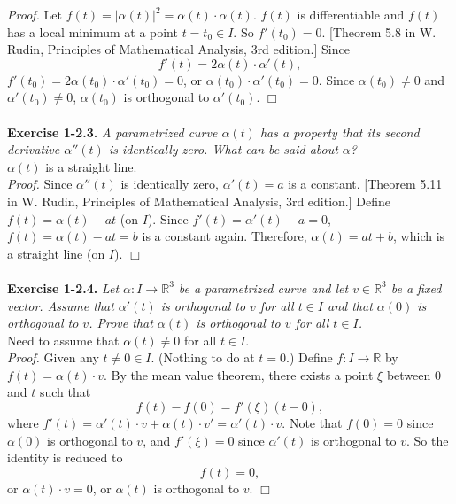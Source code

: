 \documentclass{article}
\begin{document}
\emph{Proof.}
Let $f(t) = |\alpha(t)|^2 = \alpha(t) \cdot \alpha(t)$.
$f(t)$ is differentiable and $f(t)$ has a local minimum at a point $t = t_0 \in I$.
So $f'(t_0) = 0$. [Theorem 5.8 in W. Rudin, Principles of Mathematical Analysis, 3rd edition.]
Since
$$f'(t) = 2 \alpha(t) \cdot \alpha'(t),$$
$f'(t_0) = 2 \alpha(t_0) \cdot \alpha'(t_0) = 0$,
or $\alpha(t_0) \cdot \alpha'(t_0) = 0$.
Since $\alpha(t_0) \neq 0$ and $\alpha'(t_0) \neq 0$,
$\alpha(t_0)$ is orthogonal to $\alpha'(t_0)$.
$\Box$ \\\\



\textbf{Exercise 1-2.3.}
\emph{A parametrized curve $\alpha(t)$ has a property that its second derivative
$\alpha''(t)$ is identically zero.
What can be said about $\alpha$?} \\

$\alpha(t)$ is a straight line. \\

\emph{Proof.}
Since $\alpha''(t)$ is identically zero,
$\alpha'(t) = a$ is a constant.
[Theorem 5.11 in W. Rudin, Principles of Mathematical Analysis, 3rd edition.]
Define $f(t) = \alpha(t) - at$ (on $I$).
Since $f'(t) = \alpha'(t) - a = 0$,
$f(t) = \alpha(t) - at = b$ is a constant again.
Therefore, $\alpha(t) = at+b$, which is a straight line (on $I$).
$\Box$ \\\\



\textbf{Exercise 1-2.4.}
\emph{Let $\alpha: I \to \mathbb{R}^3$ be a parametrized curve and
let $v \in \mathbb{R}^3$ be a fixed vector.
Assume that $\alpha'(t)$ is orthogonal to $v$ for all $t \in I$
and that $\alpha(0)$ is orthogonal to $v$.
Prove that $\alpha(t)$ is orthogonal to $v$ for all $t \in I$.} \\

Need to assume that $\alpha(t) \neq 0$ for all $t \in I$. \\

\emph{Proof.}
Given any $t \neq 0 \in I$. (Nothing to do at $t = 0$.)
Define $f: I \to \mathbb{R}$ by $f(t) = \alpha(t) \cdot v$.
By the mean value theorem, there exists a point $\xi$ between $0$ and $t$
such that
$$f(t) - f(0) = f'(\xi)(t - 0),$$
where $f'(t) = \alpha'(t) \cdot v + \alpha(t) \cdot v' = \alpha'(t) \cdot v$.
Note that $f(0) = 0$ since $\alpha(0)$ is orthogonal to $v$,
and $f'(\xi) = 0$ since $\alpha'(t)$ is orthogonal to $v$.
So the identity is reduced to
$$f(t) = 0,$$
or $\alpha(t) \cdot v = 0$,
or $\alpha(t)$ is orthogonal to $v$.
$\Box$ \\\\
\end{document}
